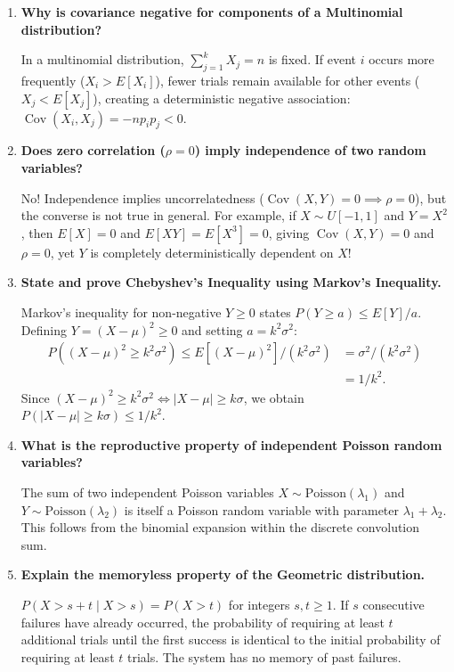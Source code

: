 \documentclass[12pt,a4paper]{article}
\newcommand{\Q}[1]{\textbf{#1}\par\noindent\ignorespaces}
\begin{document}
\begin{tcolorbox}[exambox, title={\textbf{Frequently Asked / Viva Questions}}]
\begin{enumerate}[topsep=0pt, label=\textbf{Q\arabic*.}, itemsep=5pt]
  \item \Q{Why is covariance negative for components of a Multinomial distribution?}
  In a multinomial distribution, $\sum_{j=1}^k X_j = n$ is fixed. If event $i$ occurs more frequently ($X_i > E[X_i]$), fewer trials remain available for other events ($X_j < E[X_j]$), creating a deterministic negative association: $\operatorname{Cov}(X_i, X_j) = -n p_i p_j < 0$.

  \item \Q{Does zero correlation ($\rho = 0$) imply independence of two random variables?}
  No! Independence implies uncorrelatedness ($\operatorname{Cov}(X, Y) = 0 \implies \rho = 0$), but the converse is not true in general. For example, if $X \sim U[-1, 1]$ and $Y = X^2$, then $E[X] = 0$ and $E[XY] = E[X^3] = 0$, giving $\operatorname{Cov}(X, Y) = 0$ and $\rho = 0$, yet $Y$ is completely deterministically dependent on $X$!
  \item \Q{State and prove Chebyshev's Inequality using Markov's Inequality.}
  Markov's inequality for non-negative $Y \ge 0$ states $P(Y \ge a) \le E[Y]/a$. Defining $Y = (X - \mu)^2 \ge 0$ and setting $a = k^2 \sigma^2$:
  \[
    \begin{aligned}
      P((X - \mu)^2 \ge k^2 \sigma^2) \le E[(X - \mu)^2] / (k^2 \sigma^2) &= \sigma^2 / (k^2 \sigma^2) \\[3pt]
      &= 1/k^2.
    \end{aligned}
  \]
   Since $(X - \mu)^2 \ge k^2 \sigma^2 \iff |X - \mu| \ge k\sigma$, we obtain $P(|X - \mu| \ge k\sigma) \le 1/k^2$.

  \item \Q{What is the reproductive property of independent Poisson random variables?}
  The sum of two independent Poisson variables $X \sim \text{Poisson}(\lambda_1)$ and $Y \sim \text{Poisson}(\lambda_2)$ is itself a Poisson random variable with parameter $\lambda_1 + \lambda_2$. This follows from the binomial expansion within the discrete convolution sum.

  \item \Q{Explain the memoryless property of the Geometric distribution.}
  $P(X > s + t \mid X > s) = P(X > t)$ for integers $s, t \ge 1$. If $s$ consecutive failures have already occurred, the probability of requiring at least $t$ additional trials until the first success is identical to the initial probability of requiring at least $t$ trials. The system has no memory of past failures.
\end{enumerate}
\end{tcolorbox}
\end{document}

